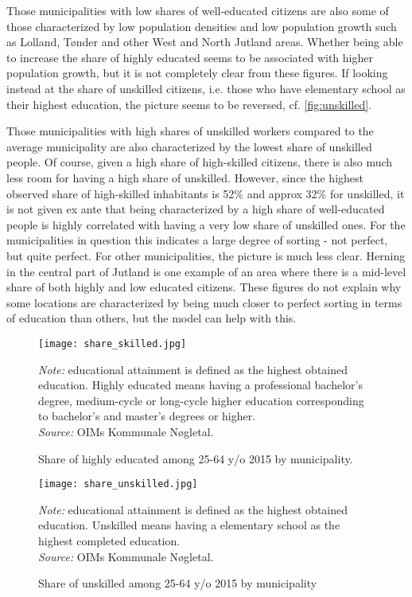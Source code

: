  Those municipalities with low shares of well-educated citizens are also some of those characterized by low population densities and low population growth such as Lolland, Tønder and other West and North Jutland areas. Whether being able to increase the share of highly educated seems to be associated with higher population growth, but it is not completely clear from these figures. If looking instead at the share of unskilled citizens, i.e. those who have elementary school as their highest education, the picture seems to be reversed, cf. \autoref{fig:unskilled}. 

 Those municipalities with high shares of unskilled workers compared to the average municipality are also characterized by the lowest share of unskilled people. Of course, given a high share of high-skilled citizens, there is also much less room for having a high share of unskilled. However, since the highest observed share of high-skilled inhabitants is 52\% and approx 32\% for unskilled, it is not given ex ante that being characterized by a high share of well-educated people is highly correlated with having a very low share of unskilled ones. For the municipalities in question this indicates a large degree of sorting - not perfect, but quite perfect. For other municipalities, the picture is much less clear. Herning in the central part of Jutland is one example of an area where there is a mid-level share of both highly and low educated citizens. These figures do not explain why some locations are characterized by being much closer to perfect sorting in terms of education than others, but the model can help with this. 

\begin{figure}{}
\centering
\begin{minipage}{0.55\textwidth}
\texttt{[image: share\_skilled.jpg]} 
{\tiny \emph{Note:} educational attainment is defined as the highest obtained education. Highly educated means having a professional bachelor's degree, medium-cycle or long-cycle higher education corresponding to bachelor's and master's degrees or higher. \\ \emph{Source:} OIMs Kommunale Nøgletal. \par}
\end{minipage}
\caption{Share of highly educated among 25-64 y/o 2015 by municipality.}
\label{fig:higheduc}
\end{figure}


\begin{figure}
\centering
\begin{minipage}{0.55\textwidth}
\texttt{[image: share\_unskilled.jpg]} 
{\tiny \emph{Note:} educational attainment is defined as the highest obtained education. Unskilled means having a elementary school as the highest completed education. \\ \emph{Source:} OIMs Kommunale Nøgletal.\par}
\end{minipage}
\caption{Share of unskilled among 25-64 y/o 2015 by municipality}
\label{fig:unskilled}
\end{figure}

